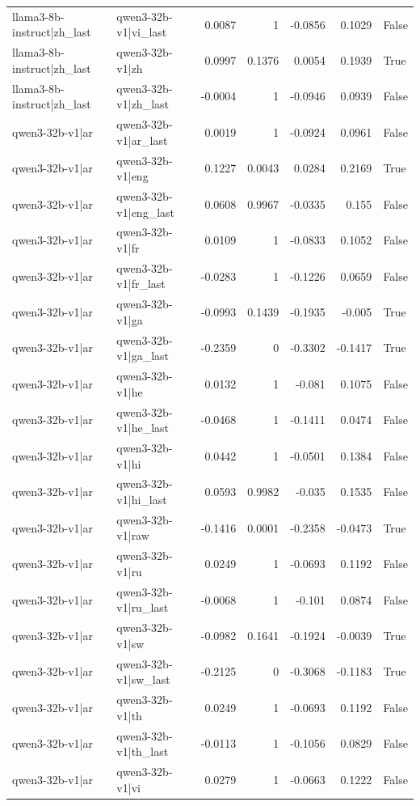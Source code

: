 \begin{table}
\begin{tabular}{l l r r r r l}
llama3-8b-instruct|zh_last & qwen3-32b-v1|vi_last & 0.0087 & 1 & -0.0856 & 0.1029 & False \\
llama3-8b-instruct|zh_last & qwen3-32b-v1|zh & 0.0997 & 0.1376 & 0.0054 & 0.1939 & True \\
llama3-8b-instruct|zh_last & qwen3-32b-v1|zh_last & -0.0004 & 1 & -0.0946 & 0.0939 & False \\
qwen3-32b-v1|ar & qwen3-32b-v1|ar_last & 0.0019 & 1 & -0.0924 & 0.0961 & False \\
qwen3-32b-v1|ar & qwen3-32b-v1|eng & 0.1227 & 0.0043 & 0.0284 & 0.2169 & True \\
qwen3-32b-v1|ar & qwen3-32b-v1|eng_last & 0.0608 & 0.9967 & -0.0335 & 0.155 & False \\
qwen3-32b-v1|ar & qwen3-32b-v1|fr & 0.0109 & 1 & -0.0833 & 0.1052 & False \\
qwen3-32b-v1|ar & qwen3-32b-v1|fr_last & -0.0283 & 1 & -0.1226 & 0.0659 & False \\
qwen3-32b-v1|ar & qwen3-32b-v1|ga & -0.0993 & 0.1439 & -0.1935 & -0.005 & True \\
qwen3-32b-v1|ar & qwen3-32b-v1|ga_last & -0.2359 & 0 & -0.3302 & -0.1417 & True \\
qwen3-32b-v1|ar & qwen3-32b-v1|he & 0.0132 & 1 & -0.081 & 0.1075 & False \\
qwen3-32b-v1|ar & qwen3-32b-v1|he_last & -0.0468 & 1 & -0.1411 & 0.0474 & False \\
qwen3-32b-v1|ar & qwen3-32b-v1|hi & 0.0442 & 1 & -0.0501 & 0.1384 & False \\
qwen3-32b-v1|ar & qwen3-32b-v1|hi_last & 0.0593 & 0.9982 & -0.035 & 0.1535 & False \\
qwen3-32b-v1|ar & qwen3-32b-v1|raw & -0.1416 & 0.0001 & -0.2358 & -0.0473 & True \\
qwen3-32b-v1|ar & qwen3-32b-v1|ru & 0.0249 & 1 & -0.0693 & 0.1192 & False \\
qwen3-32b-v1|ar & qwen3-32b-v1|ru_last & -0.0068 & 1 & -0.101 & 0.0874 & False \\
qwen3-32b-v1|ar & qwen3-32b-v1|sw & -0.0982 & 0.1641 & -0.1924 & -0.0039 & True \\
qwen3-32b-v1|ar & qwen3-32b-v1|sw_last & -0.2125 & 0 & -0.3068 & -0.1183 & True \\
qwen3-32b-v1|ar & qwen3-32b-v1|th & 0.0249 & 1 & -0.0693 & 0.1192 & False \\
qwen3-32b-v1|ar & qwen3-32b-v1|th_last & -0.0113 & 1 & -0.1056 & 0.0829 & False \\
qwen3-32b-v1|ar & qwen3-32b-v1|vi & 0.0279 & 1 & -0.0663 & 0.1222 & False \\

\end{tabular}
\end{table}
